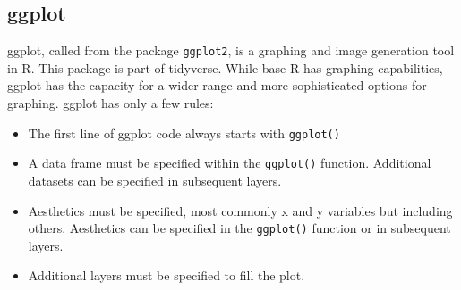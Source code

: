 \documentclass[
]{article}
\newenvironment{Shaded}{\begin{snugshade}}{\end{snugshade}}
\newcommand{\CommentTok}[1]{\textcolor[rgb]{0.56,0.35,0.01}{\textit{#1}}}
\newcommand{\DataTypeTok}[1]{\textcolor[rgb]{0.13,0.29,0.53}{#1}}
\newcommand{\KeywordTok}[1]{\textcolor[rgb]{0.13,0.29,0.53}{\textbf{#1}}}
\newcommand{\NormalTok}[1]{#1}
\newcommand{\OperatorTok}[1]{\textcolor[rgb]{0.81,0.36,0.00}{\textbf{#1}}}
\newcommand{\StringTok}[1]{\textcolor[rgb]{0.31,0.60,0.02}{#1}}
\providecommand{\tightlist}{%
  \setlength{\itemsep}{0pt}\setlength{\parskip}{0pt}}
\begin{document}
\begin{Shaded}
\end{Shaded}

\hypertarget{ggplot}{%
\subsection{ggplot}\label{ggplot}}

ggplot, called from the package \texttt{ggplot2}, is a graphing and
image generation tool in R. This package is part of tidyverse. While
base R has graphing capabilities, ggplot has the capacity for a wider
range and more sophisticated options for graphing. ggplot has only a few
rules:

\begin{itemize}
\tightlist
\item
  The first line of ggplot code always starts with \texttt{ggplot()}
\item
  A data frame must be specified within the \texttt{ggplot()} function.
  Additional datasets can be specified in subsequent layers.
\item
  Aesthetics must be specified, most commonly x and y variables but
  including others. Aesthetics can be specified in the \texttt{ggplot()}
  function or in subsequent layers.
\item
  Additional layers must be specified to fill the plot.
\end{itemize}
\end{document}
